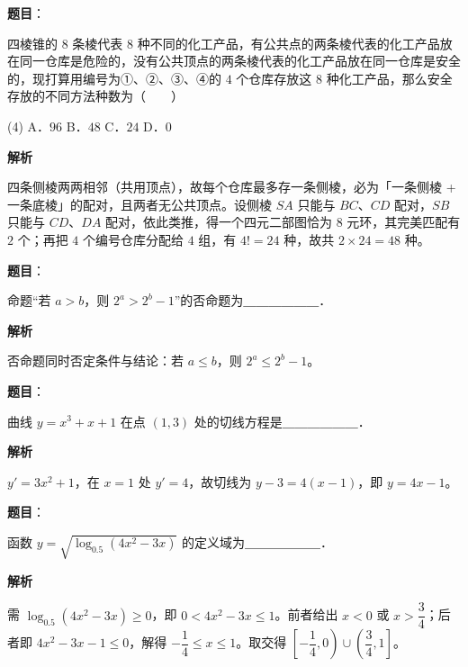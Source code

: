 \begin{answer}

\textbf{题目}：

四棱锥的 $8$ 条棱代表 $8$ 种不同的化工产品，有公共点的两条棱代表的化工产品放在同一仓库是危险的，没有公共顶点的两条棱代表的化工产品放在同一仓库是安全的，现打算用编号为①、②、③、④的 $4$ 个仓库存放这 $8$ 种化工产品，那么安全存放的不同方法种数为\mbox{（　　）}

\begin{gkopts}(4)
\task A．$96$
\task B．$48$
\task C．$24$
\task D．$0$
\end{gkopts}

\textbf{解析}

四条侧棱两两相邻（共用顶点），故每个仓库最多存一条侧棱，必为「一条侧棱 + 一条底棱」的配对，且两者无公共顶点。设侧棱 $SA$ 只能与 $BC$、$CD$ 配对，$SB$ 只能与 $CD$、$DA$ 配对，依此类推，得一个四元二部图恰为 $8$ 元环，其完美匹配有 $2$ 个；再把 $4$ 个编号仓库分配给 $4$ 组，有 $4! = 24$ 种，故共 $2\times 24 = 48$ 种。


\end{answer}
\begin{answer}

\textbf{题目}：

命题“若 $a > b$，则 $2^a > 2^b - 1$”的否命题为＿＿＿＿＿＿．

\textbf{解析}

否命题同时否定条件与结论：若 $a \leqslant b$，则 $2^a \leqslant 2^b - 1$。


\end{answer}
\begin{answer}

\textbf{题目}：

曲线 $y = x^3 + x + 1$ 在点 $(1, 3)$ 处的切线方程是＿＿＿＿＿＿．

\textbf{解析}

$y' = 3x^2 + 1$，在 $x = 1$ 处 $y' = 4$，故切线为 $y - 3 = 4(x - 1)$，即 $y = 4x - 1$。


\end{answer}
\begin{answer}

\textbf{题目}：

函数 $y = \sqrt{\log_{0.5}(4x^2 - 3x)}$ 的定义域为＿＿＿＿＿＿．

\textbf{解析}

需 $\log_{0.5}(4x^2 - 3x) \geqslant 0$，即 $0 < 4x^2 - 3x \leqslant 1$。前者给出 $x < 0$ 或 $x > \dfrac{3}{4}$；后者即 $4x^2 - 3x - 1 \leqslant 0$，解得 $-\dfrac{1}{4} \leqslant x \leqslant 1$。取交得 $\left[-\dfrac{1}{4}, 0\right) \cup \left(\dfrac{3}{4}, 1\right]$。


\end{answer}
